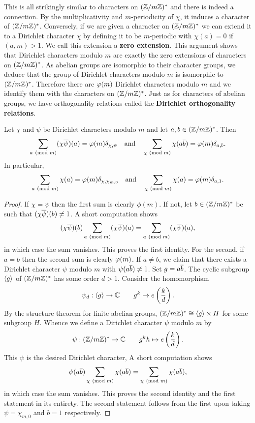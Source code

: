     This is all strikingly similar to characters on \((\mathbb{Z}/m\mathbb{Z})^{\ast}\) and there is indeed a connection. By the multiplicativity and \(m\)-periodicity of \(\chi\), it induces a character of \((\mathbb{Z}/m\mathbb{Z})^{\ast}\). Conversely, if we are given a character on \((\mathbb{Z}/m\mathbb{Z})^{\ast}\) we can extend it to a Dirichlet character \(\chi\) by defining it to be \(m\)-periodic with \(\chi(a) = 0\) if \((a,m) > 1\). We call this extension a \textbf{zero extension}. This argument shows that Dirichlet characters modulo \(m\) are exactly the zero extensions of characters on \((\mathbb{Z}/m\mathbb{Z})^{\ast}\). As abelian groups are isomorphic to their character groups, we deduce that the group of Dirichlet characters modulo \(m\) is isomorphic to \((\mathbb{Z}/m\mathbb{Z})^{\ast}\). Therefore there are \(\varphi(m)\) Dirichlet characters modulo \(m\) and we identify them with the characters on \((\mathbb{Z}/m\mathbb{Z})^{\ast}\). Just as for characters of abelian groups, we have orthogonality relations called the \textbf{Dirichlet orthogonality relations}.

    \begin{proposition*}
    Let \(\chi\) and \(\psi\) be Dirichlet characters modulo \(m\) and let \(a,b \in (\mathbb{Z}/m\mathbb{Z})^{\ast}\). Then
    \[
      \sum_{a \ (\mathrm{mod}\text{ }m)}(\chi\overline{\psi})(a) = \varphi(m)\delta_{\chi,\psi} \quad \text{and} \quad \sum_{\chi \ (\mathrm{mod}\text{ }m)}\chi(a\overline{b}) = \varphi(m)\delta_{a,b}.
    \]
    In particular,
    \[
      \sum_{a \ (\mathrm{mod}\text{ }m)}\chi(a) = \varphi(m)\delta_{\chi,\chi_{m,0}} \quad \text{and} \quad \sum_{\chi \ (\mathrm{mod}\text{ }m)}\chi(a) = \varphi(m)\delta_{a,1}.
    \]
    \end{proposition*}
    \begin{proof}
      If \(\chi = \psi\) then the first sum is clearly \(\phi(m)\). If not, let \(b \in (\mathbb{Z}/m\mathbb{Z})^{\ast}\) be such that \((\chi\overline{\psi})(b) \neq 1\). A short computation shows
      \[
        (\chi\overline{\psi})(b)\sum_{a \ (\mathrm{mod}\text{ }m)}(\chi\overline{\psi})(a) = \sum_{a \ (\mathrm{mod}\text{ }m)}(\chi\overline{\psi})(a),
      \]
      in which case the sum vanishes. This proves the first identity. For the second, if \(a = b\) then the second sum is clearly \(\varphi(m)\). If \(a \neq b\), we claim that there exists a Dirichlet character \(\psi\) modulo \(m\) with \(\psi(a\overline{b}) \neq 1\). Set \(g = a\overline{b}\). The cyclic subgroup \(\langle g\rangle\) of \((\mathbb{Z}/m\mathbb{Z})^{\ast}\) has some order \(d > 1\). Consider the homomorphism
      \[
        \psi_{d}:\langle g\rangle \to \mathbb{C} \qquad g^{k} \mapsto e\left(\frac{k}{d}\right).
      \]
      By the structure theorem for finite abelian groups, \((\mathbb{Z}/m\mathbb{Z})^{\ast} \cong \langle g\rangle \times H\) for some subgroup \(H\). Whence we define a Dirichlet character \(\psi\) modulo \(m\) by
      \[
        \psi:(\mathbb{Z}/m\mathbb{Z})^{\ast} \to \mathbb{C} \qquad g^{k}h \mapsto e\left(\frac{k}{d}\right).
      \]
      This \(\psi\) is the desired Dirichlet character, A short computation shows
      \[
        \psi(a\overline{b})\sum_{\chi \ (\mathrm{mod}\text{ }m)}\chi(a\overline{b}) = \sum_{\chi \ (\mathrm{mod}\text{ }m)}\chi(a\overline{b}),
      \]
      in which case the sum vanishes. This proves the second identity and the first statement in its entirety. The second statement follows from the first upon taking \(\psi = \chi_{m,0}\) and \(b = 1\) respectively.
    \end{proof}

